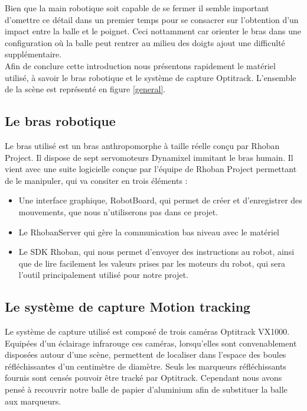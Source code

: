 \documentclass{article}[11pt]
\begin{document}
Bien que la main robotique soit capable de se fermer il semble important d'omettre ce détail dans un premier temps pour se consacrer sur l'obtention d'un impact entre la balle et le poignet. Ceci nottamment car orienter le bras dans une configuration où la balle peut rentrer au milieu des doigts ajout une difficulté supplémentaire. \\

Afin de conclure cette introduction nous présentons rapidement le matériel utilisé, à savoir le bras robotique et le système de capture Optitrack. L'ensemble de la scène est représenté en figure \ref{general}.

\subsection{Le bras robotique}

Le bras utilisé est un bras anthropomorphe à taille réelle conçu par Rhoban Project. Il dispose de sept servomoteurs Dynamixel immitant le bras humain. Il vient avec une suite logicielle conçue par l'équipe de Rhoban Project permettant de le manipuler, qui va consiter en trois éléments : \\

\begin{itemize}
\item Une interface graphique, RobotBoard, qui permet de créer et d'enregistrer des mouvements, que nous n'utiliserons pas dans ce projet. 
\item Le RhobanServer qui gère la communication bas niveau avec le matériel
\item Le SDK Rhoban, qui nous permet d'envoyer des instructions au robot, ainsi que de lire facilement les valeurs prises par les moteurs du robot, qui sera l'outil principalement utilisé pour notre projet.
\end{itemize}

\subsection{Le système de capture \og Motion tracking\fg}

Le système de capture utilisé est composé de trois caméras Optitrack VX1000. Equipées d'un éclairage infrarouge ces caméras, lorsqu'elles sont convenablement disposées autour d'une scène, permettent de localiser dans l'espace des boules réfléchissantes d'un centimètre de diamètre. Seuls les marqueurs réfléchissants fournis sont censés pouvoir être tracké par Optitrack. Cependant nous avons pensé à recouvrir notre balle de papier d'aluminium afin de substituer la balle aux marqueurs. \\
\end{document}
